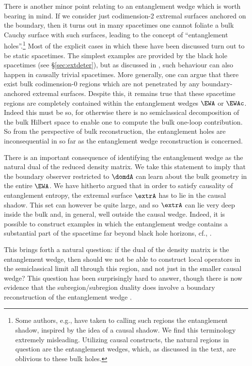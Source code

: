 \documentclass[12pt,openany]{book}
\begin{document}
There is another minor point relating to an entanglement wedge which is worth bearing in mind. If we consider just codimension-2 extremal surfaces anchored on the boundary, then it turns out in many spacetimes one cannot foliate a bulk Cauchy surface with such surfaces, leading to the concept of  ``entanglement holes''.\footnote{ Some authors, e.g., \cite{Balasubramanian:2014sra} have taken to calling such regions the entanglement shadow, inspired by the idea of a causal shadow. We find this terminology extremely misleading. Utilizing causal constructs,  the natural regions in question are the entanglement wedges, which, as discussed in the text, are oblivious to these bulk holes.}  Most of the explicit cases in which  these have been discussed turn out to be static spacetimes.  The simplest examples are provided by the  black hole spacetimes \cite{Hubeny:2013gta} (see \S\ref{sec:extdeter}), but as discussed in \cite{Czech:2012bh,Nogueira:2013if,Gentle:2013fma}, such behaviour can also happen in causally trivial spacetimes. More generally,  one can argue that there exist bulk codimension-0 regions which are not penetrated by any boundary-anchored extremal surfaces.   Despite this, it remains true that these spacetime regions are completely contained within the entanglement wedges $\EWA$ or $\EWAc$. Indeed this must be so, for otherwise there is no semiclassical decomposition of the  bulk Hilbert space to enable one to compute the bulk one-loop contribution. So from the perspective of bulk reconstruction, the entanglement holes are inconsequential in so far as the entanglement wedge reconstruction is concerned.


 There is an important consequence of identifying the entanglement wedge as the natural dual of the reduced density matrix. We take this statement to imply that the boundary observer restricted to $\domdA$ can learn about the bulk geometry in the entire  $\EWA$. We have hitherto argued that in order to satisfy causality of entanglement entropy, the extremal surface $\extrA$ has to lie in the causal shadow.  This set can however be quite large, and so $\extrA$ can lie very deep inside the bulk and, in general, well outside the causal wedge. Indeed, it is possible to construct examples in which the entanglement wedge contains a substantial part of the spacetime far beyond  black hole horizons, cf., \cite{Headrick:2014cta}.

 This brings forth a natural question: if the dual of the density matrix is the entanglement wedge, then should we not be able to construct local operators in the semiclassical limit all through this region, and not just in the smaller causal wedge?  This question has been surprisingly hard to answer, though there is now evidence that the subregion/subregion duality does involve a boundary reconstruction of the entanglement wedge \cite{Almheiri:2014lwa,Jafferis:2015del,Dong:2016eik}.
\end{document}
